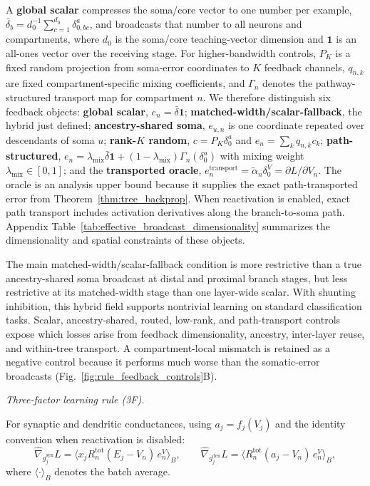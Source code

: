     A \textbf{global scalar} compresses the soma/core vector to one number per example, $\bar{\delta}_b=d_0^{-1}\sum_{c=1}^{d_0}\delta_{0,bc}^{a}$, and broadcasts that number to all neurons and compartments, where $d_0$ is the soma/core teaching-vector dimension and $\mathbf{1}$ is an all-ones vector over the receiving stage. For higher-bandwidth controls, $P_K$ is a fixed random projection from soma-error coordinates to $K$ feedback channels, $q_{n,k}$ are fixed compartment-specific mixing coefficients, and $\Gamma_n$ denotes the pathway-structured transport map for compartment $n$. We therefore distinguish six feedback objects: \textbf{global scalar}, $e_n=\bar{\delta}\mathbf{1}$; \textbf{matched-width/scalar-fallback}, the hybrid just defined; \textbf{ancestry-shared soma}, $e_{u,n}$ is one coordinate repeated over descendants of soma $u$; \textbf{rank-$K$ random}, $c=P_K\delta_0^a$ and $e_n=\sum_k q_{n,k}c_k$; \textbf{path-structured}, $e_n=\lambda_{\mathrm{mix}}\bar{\delta}\mathbf{1}+(1-\lambda_{\mathrm{mix}})\Gamma_n(\delta_0^a)$ with mixing weight $\lambda_{\mathrm{mix}}\in[0,1]$; and the \textbf{transported oracle}, $e_n^{\mathrm{transport}}=\tilde{\alpha}_n\delta_0^V=\partial L/\partial V_n$. The oracle is an analysis upper bound because it supplies the exact path-transported error from Theorem~\ref{thm:tree_backprop}. When reactivation is enabled, exact path transport includes activation derivatives along the branch-to-soma path. Appendix Table~\ref{tab:effective_broadcast_dimensionality} summarizes the dimensionality and spatial constraints of these objects.

    The main matched-width/scalar-fallback condition is more restrictive than a true ancestry-shared soma broadcast at distal and proximal branch stages, but less restrictive at its matched-width stage than one layer-wide scalar. With shunting inhibition, this hybrid field supports nontrivial learning on standard classification tasks. Scalar, ancestry-shared, routed, low-rank, and path-transport controls expose which losses arise from feedback dimensionality, ancestry, inter-layer reuse, and within-tree transport. A compartment-local mismatch is retained as a negative control because it performs much worse than the somatic-error broadcasts (Fig.~\ref{fig:rule_feedback_controls}B).
    
    \noindent\emph{Three-factor learning rule (3F).}
    \begin{definition}[3F Update]
    For synaptic and dendritic conductances, using $a_j=f_j(V_j)$ and the identity convention when reactivation is disabled:
    \begin{equation}
    \widehat{\nabla}_{g_j^{\mathrm{syn}}}L = \langle x_j R_n^{\mathrm{tot}} (E_j - V_n)\, e_n^V \rangle_B,
    \qquad
    \widehat{\nabla}_{g_j^{\mathrm{den}}}L = \langle R_n^{\mathrm{tot}} (a_j - V_n)\, e_n^V \rangle_B,
    \label{eq:3f}
    \end{equation}
    where $\langle\cdot\rangle_B$ denotes the batch average.
    \end{definition}
    
